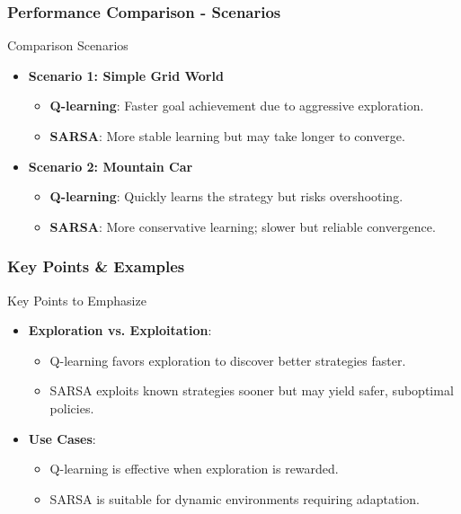 \documentclass{beamer}
\begin{document}
\begin{frame}[fragile]
    \frametitle{Performance Comparison - Scenarios}
    \begin{block}{Comparison Scenarios}
        \begin{itemize}
            \item \textbf{Scenario 1: Simple Grid World}
                \begin{itemize}
                    \item \textbf{Q-learning}: Faster goal achievement due to aggressive exploration.
                    \item \textbf{SARSA}: More stable learning but may take longer to converge.
                \end{itemize}

            \item \textbf{Scenario 2: Mountain Car}
                \begin{itemize}
                    \item \textbf{Q-learning}: Quickly learns the strategy but risks overshooting.
                    \item \textbf{SARSA}: More conservative learning; slower but reliable convergence.
                \end{itemize}
        \end{itemize}
    \end{block}
\end{frame}

\begin{frame}[fragile]
    \frametitle{Key Points & Examples}
    \begin{block}{Key Points to Emphasize}
        \begin{itemize}
            \item \textbf{Exploration vs. Exploitation}:
                \begin{itemize}
                    \item Q-learning favors exploration to discover better strategies faster.
                    \item SARSA exploits known strategies sooner but may yield safer, suboptimal policies.
                \end{itemize}
            \item \textbf{Use Cases}:
                \begin{itemize}
                    \item Q-learning is effective when exploration is rewarded.
                    \item SARSA is suitable for dynamic environments requiring adaptation.
                \end{itemize}
        \end{itemize}
    \end{block}
\end{frame}
\end{document}
